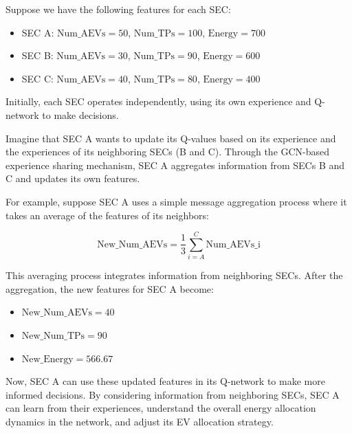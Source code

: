 Suppose we have the following features for each SEC:

\begin{itemize}
    \item SEC A: $\text{Num\_AEVs} = 50$, $\text{Num\_TPs} = 100$, $\text{Energy} = 700$
    \item SEC B: $\text{Num\_AEVs} = 30$, $\text{Num\_TPs} = 90$, $\text{Energy} = 600$
    \item SEC C: $\text{Num\_AEVs} = 40$, $\text{Num\_TPs} = 80$, $\text{Energy} = 400$
\end{itemize}

Initially, each SEC operates independently, using its own experience and Q-network to make decisions.

Imagine that SEC A wants to update its Q-values based on its experience and the experiences of its neighboring SECs (B and C). Through the GCN-based experience sharing mechanism, SEC A aggregates information from SECs B and C and updates its own features.

For example, suppose SEC A uses a simple message aggregation process where it takes an average of the features of its neighbors:

\[
\text{New\_Num\_AEVs} = \frac{1}{3} \sum_{i=A}^{C} \text{Num\_AEVs\_i}
\]


This averaging process integrates information from neighboring SECs. After the aggregation, the new features for SEC A become:
\begin{itemize}
    \item $\text{New\_Num\_AEVs} = 40$
    \item $\text{New\_Num\_TPs} = 90$
    \item $\text{New\_Energy} = 566.67$
\end{itemize}

Now, SEC A can use these updated features in its Q-network to make more informed decisions. By considering information from neighboring SECs, SEC A can learn from their experiences, understand the overall energy allocation dynamics in the network, and adjust its EV allocation strategy. 


